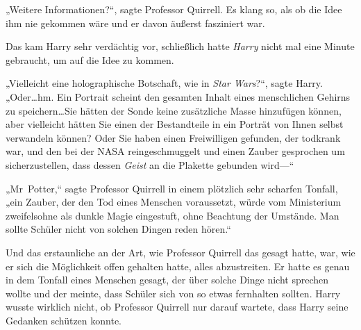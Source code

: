 „Weitere Informationen?“, sagte Professor Quirrell. Es klang so, als ob die Idee ihm nie gekommen wäre und er davon äußerst fasziniert war.

Das kam Harry sehr verdächtig vor, schließlich hatte \emph{Harry} nicht mal eine Minute gebraucht, um auf die Idee zu kommen.

„Vielleicht eine holographische Botschaft, wie in \emph{Star Wars}?“, sagte Harry. „Oder…hm. Ein Portrait scheint den gesamten Inhalt eines menschlichen Gehirns zu speichern…Sie hätten der Sonde keine zusätzliche Masse hinzufügen können, aber vielleicht hätten Sie einen der Bestandteile in ein Porträt von Ihnen selbst verwandeln können? Oder Sie haben einen Freiwilligen gefunden, der todkrank war, und den bei der NASA reingeschmuggelt und einen Zauber gesprochen um sicherzustellen, dass dessen \emph{Geist} an die Plakette gebunden wird—“

„Mr~Potter,“ sagte Professor Quirrell in einem plötzlich sehr scharfen Tonfall, „ein Zauber, der den Tod eines Menschen voraussetzt, würde vom Ministerium zweifelsohne als dunkle Magie eingestuft, ohne Beachtung der Umstände. Man sollte Schüler nicht von solchen Dingen reden hören.“

Und das erstaunliche an der Art, wie Professor Quirrell das gesagt hatte, war, wie er sich die Möglichkeit offen gehalten hatte, alles abzustreiten. Er hatte es genau in dem Tonfall eines Menschen gesagt, der über solche Dinge nicht sprechen wollte und der meinte, dass Schüler sich von so etwas fernhalten sollten. Harry wusste wirklich nicht, ob Professor Quirrell nur darauf wartete, dass Harry seine Gedanken schützen konnte.


